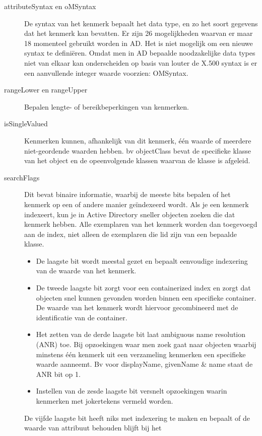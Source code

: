 \begin{description}
	\item[attributeSyntax en oMSyntax] De syntax van het kenmerk bepaalt het
		data type, en zo het soort gegevens dat het kenmerk kan
		bevatten. Er zijn 26 mogelijkheden waarvan er maar 18 momenteel
		gebruikt worden in AD. Het is niet mogelijk om een nieuwe syntax
		te definiëren. Omdat men in AD bepaalde noodzakelijke data types
		niet van elkaar kan onderscheiden op basis van louter de X.500
		syntax is er een aanvullende integer waarde voorzien: OMSyntax.
	\item[rangeLower en rangeUpper] Bepalen lengte- of bereikbeperkingen van
		kenmerken.
	\item[isSingleValued] Kenmerken kunnen, afhankelijk van dit kenmerk, één
		waarde of meerdere niet-geordende waarden hebben. bv objectClass
		bevat de specifieke klasse van het object en de opeenvolgende
		klassen waarvan de klasse is afgeleid.
	\item[searchFlags] Dit bevat binaire informatie, waarbij de meeste bits
		bepalen of het kenmerk op een of andere manier geïndexeerd
		wordt. Als je een kenmerk indexeert, kun je in Active Directory
		sneller objecten zoeken die dat kenmerk hebben. Alle exemplaren
		van het kenmerk worden dan toegevoegd aan de index, niet alleen
		de exemplaren die lid zijn van een bepaalde klasse.
		\begin{itemize}
			\item De laagste bit wordt meestal gezet en bepaalt
				eenvoudige indexering van de waarde van het
				kenmerk.
			\item De tweede laagste bit zorgt voor een containerized
				index en zorgt dat objecten snel kunnen gevonden
				worden binnen een specifieke container. De
				waarde van het kenmerk wordt hiervoor
				gecombineerd met de identificatie van de
				container.
			\item Het zetten van de derde laagste bit laat ambiguous
				name resolution (ANR) toe. Bij opzoekingen waar
				men zoek gaat naar objecten waarbij minstens één
				kenmerk uit een verzameling kenmerken een
				specifieke waarde aanneemt. Bv voor displayName,
				givenName \& name staat de ANR bit op 1.
			\item Instellen van de zesde laagste bit versnelt
				opzoekingen waarin kenmerken met jokertekens
				vermeld worden.
		\end{itemize}
		De vijfde laagste bit heeft niks met indexering te maken en
		bepaalt of de waarde van attribuut behouden blijft bij het

\end{description}
